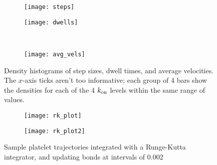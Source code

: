 \documentclass{article}
\newcommand{\tn}{\textnormal}
\begin{document}
\begin{figure}
  \centering
  \begin{subfigure}{0.49\textwidth}
    \texttt{[image: steps]}
  \end{subfigure}
  \hfill
 \begin{subfigure}{0.49\textwidth}
   \texttt{[image: dwells]}
 \end{subfigure}
 \\
 \begin{subfigure}{0.49\textwidth}
   \texttt{[image: avg\_vels]}
 \end{subfigure}
  \caption{Density histograms of step sizes, dwell times, and average
    velocities. The $x$-axis ticks aren't too informative; each group
    of 4 bars show the densities for each of the 4 $k_\tn{on}$ levels
    within the same range of values.} 
  \label{fig:other-data}
\end{figure}

\begin{figure}[h]
  \centering
  \begin{subfigure}{0.49\textwidth}
    \texttt{[image: rk\_plot]}
  \end{subfigure}
  \hfill
  \begin{subfigure}{0.49\textwidth}
    \texttt{[image: rk\_plot2]}
  \end{subfigure}
  \caption{Sample platelet trajectories integrated with a Runge-Kutta
    integrator, and updating bonds at intervals of 0.002}
  \label{fig:traj03}
\end{figure}



\end{document}
